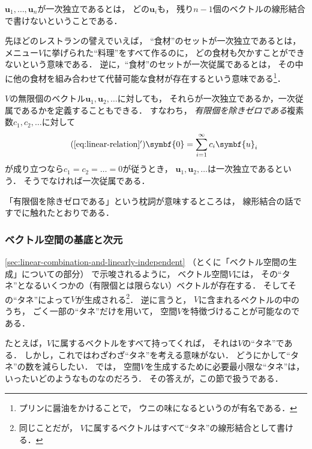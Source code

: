 \documentclass[
]{sotsu}
\begin{document}
$\symbf{u}_1, \dots, \symbf{u}_n$が一次独立であるとは，
どの$\symbf{u}_i$も，
残り$n-1$個のベクトルの線形結合で書けないということである．

先ほどのレストランの譬えでいえば，
``食材''のセットが一次独立であるとは，
メニュー$V$に挙げられた``料理''をすべて作るのに，
どの食材も欠かすことができないという意味である．
逆に，``食材''のセットが一次従属であるとは，
その中に他の食材を組み合わせて代替可能な食材が存在するという意味である\footnote{
    プリンに醤油をかけることで，
    ウニの味になるというのが有名である．
}．




\quad 
$V$の無限個のベクトル$\symbf{u}_1, \symbf{u}_2, \dotsc$に対しても，
それらが一次独立であるか，一次従属であるかを定義することもできる．
すなわち，
\emph{有限個を除きゼロである}複素数$c_1, c_2, \dotsc$に対して
\begin{equation}
    \label{eq:infinite-linear-relation}
    \tag{\ref*{eq:linear-relation}$'$}
    \symbf{0} = \sum_{i = 1}^{\infty} c_i \symbf{u}_i
\end{equation}
が成り立つなら$c_1 = c_2 = \dots = 0$が従うとき，
$\symbf{u}_1, \symbf{u}_2, \dotsc$は一次独立であるという．
そうでなければ一次従属である．

「有限個を除きゼロである」という枕詞が意味するところは，
線形結合の話ですでに触れたとおりである．





\subsubsection{ベクトル空間の基底と次元}
\label{sec:basis-and-dimension}

\cref{sec:linear-combination-and-linearly-independent}
（とくに「ベクトル空間の生成」についての部分）
で示唆されるように，
ベクトル空間$V$には，
その``タネ''となるいくつかの（有限個とは限らない）ベクトルが存在する．
そしてその``タネ''によって$V$が生成される\footnote{
    同じことだが，
    $V$に属するベクトルはすべて``タネ''の線形結合として書ける．
}．
逆に言うと，
$V$に含まれるベクトルの中のうち，
ごく一部の``タネ''だけを用いて，
空間$V$を特徴づけることが可能なのである．

たとえば，$V$に属するベクトルをすべて持ってくれば，
それは$V$の``タネ''である．
しかし，これではわざわざ``タネ''を考える意味がない．
どうにかして``タネ''の数を減らしたい．
では，
空間$V$を生成するために必要最小限な``タネ''は，
いったいどのようなものなのだろう．
その答えが，この節で扱うである．
\end{document}

